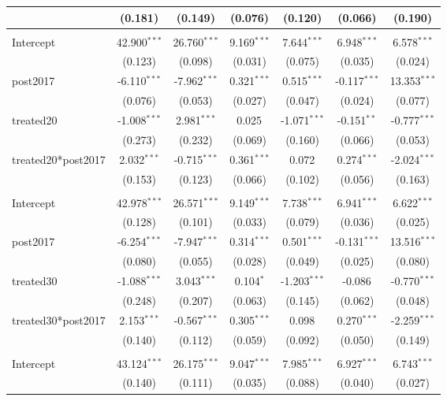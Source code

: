 \documentclass[12pt]{article}
\begin{document}
\begin{table}[!htbp]
\begin{tabular}{@{\extracolsep{5pt}}lcccccc}
  & (0.181) & (0.149) & (0.076) & (0.120) & (0.066) & (0.190) \\
\hline \\[-1.8ex]
 Intercept & 42.900$^{***}$ & 26.760$^{***}$ & 9.169$^{***}$ & 7.644$^{***}$ & 6.948$^{***}$ & 6.578$^{***}$ \\
  & (0.123) & (0.098) & (0.031) & (0.075) & (0.035) & (0.024) \\
 post2017 & -6.110$^{***}$ & -7.962$^{***}$ & 0.321$^{***}$ & 0.515$^{***}$ & -0.117$^{***}$ & 13.353$^{***}$ \\
  & (0.076) & (0.053) & (0.027) & (0.047) & (0.024) & (0.077) \\
 treated20 & -1.008$^{***}$ & 2.981$^{***}$ & 0.025$^{}$ & -1.071$^{***}$ & -0.151$^{**}$ & -0.777$^{***}$ \\
  & (0.273) & (0.232) & (0.069) & (0.160) & (0.066) & (0.053) \\
 treated20*post2017 & 2.032$^{***}$ & -0.715$^{***}$ & 0.361$^{***}$ & 0.072$^{}$ & 0.274$^{***}$ & -2.024$^{***}$ \\
  & (0.153) & (0.123) & (0.066) & (0.102) & (0.056) & (0.163) \\
\hline \\[-1.8ex]
 Intercept & 42.978$^{***}$ & 26.571$^{***}$ & 9.149$^{***}$ & 7.738$^{***}$ & 6.941$^{***}$ & 6.622$^{***}$ \\
  & (0.128) & (0.101) & (0.033) & (0.079) & (0.036) & (0.025) \\
 post2017 & -6.254$^{***}$ & -7.947$^{***}$ & 0.314$^{***}$ & 0.501$^{***}$ & -0.131$^{***}$ & 13.516$^{***}$ \\
  & (0.080) & (0.055) & (0.028) & (0.049) & (0.025) & (0.080) \\
 treated30 & -1.088$^{***}$ & 3.043$^{***}$ & 0.104$^{*}$ & -1.203$^{***}$ & -0.086$^{}$ & -0.770$^{***}$ \\
  & (0.248) & (0.207) & (0.063) & (0.145) & (0.062) & (0.048) \\
 treated30*post2017 & 2.153$^{***}$ & -0.567$^{***}$ & 0.305$^{***}$ & 0.098$^{}$ & 0.270$^{***}$ & -2.259$^{***}$ \\
  & (0.140) & (0.112) & (0.059) & (0.092) & (0.050) & (0.149) \\
\hline \\[-1.8ex]
 Intercept & 43.124$^{***}$ & 26.175$^{***}$ & 9.047$^{***}$ & 7.985$^{***}$ & 6.927$^{***}$ & 6.743$^{***}$ \\
  & (0.140) & (0.111) & (0.035) & (0.088) & (0.040) & (0.027) \\

\end{tabular}
\end{table}
\end{document}
